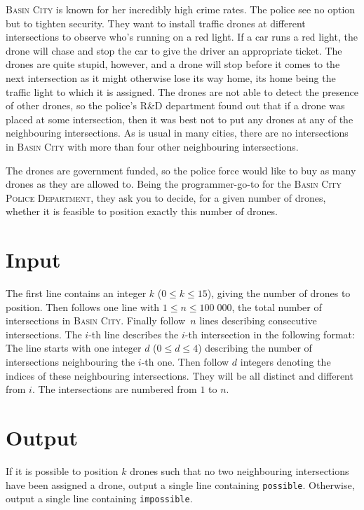 
\textsc{Basin City} is known for her incredibly high crime rates.  The
police see no option but to tighten security.  They want to install
traffic drones at different intersections to observe who's running on
a red light.  If a car runs a red light, the drone will chase and stop
the car to give the driver an appropriate ticket.  The drones are
quite stupid, however, and a drone will stop before it comes to the
next intersection as it might otherwise lose its way home, its home
being the traffic light to which it is assigned.  The drones are not
able to detect the presence of other drones, so the police's R\&D
department found out that if a drone was placed at some intersection,
then it was best not to put any drones at any of the neighbouring
intersections.  As is usual in many cities, there are no intersections
in \textsc{Basin City} with more than four other neighbouring
intersections.

The drones are government funded, so the police force would like to
buy as many drones as they are allowed to.  Being the programmer-go-to
for the \textsc{Basin City Police Department}, they ask you to decide,
for a given number of drones, whether it is feasible to position
exactly this number of drones.

\section*{Input}
The first line contains an integer $k$ ($0 \leq k \leq 15$), giving the
number of drones to position.  Then follows one line with $1 \leq n
\leq 100\;000$, the total number of intersections in \textsc{Basin
  City}.  Finally follow~$n$ lines describing consecutive
intersections.  The $i$-th line describes the $i$-th intersection in
the following format: The line starts with one integer $d$ ($0 \leq d
\leq 4$) describing the number of intersections neighbouring the
$i$-th one.  Then follow $d$ integers denoting the indices of these
neighbouring intersections.  They will be all distinct and different
from $i$.  The intersections are numbered from $1$ to $n$.


\section*{Output}
If it is possible to position $k$ drones such that no two neighbouring
intersections have been assigned a drone, output a single line
containing \texttt{possible}.  Otherwise, output a single line
containing \texttt{impossible}.
